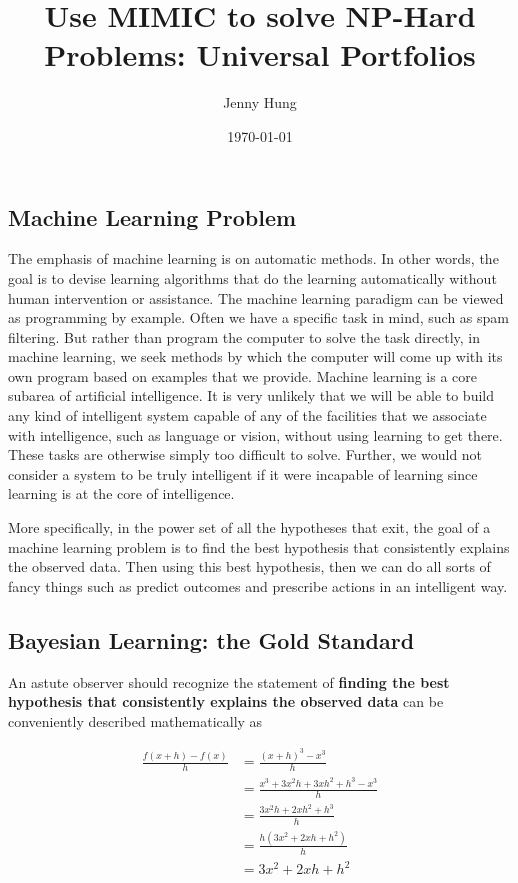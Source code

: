 \documentclass{article}
\begin{document}
\title{Use MIMIC to solve NP-Hard Problems: Universal Portfolios}
\author{Jenny Hung}
\date{\today}
\maketitle

\subsection*{Machine Learning Problem}
The emphasis of machine learning is on automatic methods. In other words, the goal is to devise learning algorithms that do the learning automatically without human intervention or assistance. The machine learning paradigm can be viewed as programming by example. Often we have a specific task in mind, such as spam filtering. But rather than program the computer to solve the task directly, in machine learning, we seek methods by which the computer will come up with its own program based on examples that we provide. Machine learning is a core subarea of artificial intelligence. It is very unlikely that we will be able to build any kind of intelligent system capable of any of the facilities that we associate with intelligence, such as language or vision, without using learning to get there. These tasks are otherwise simply too difficult to solve. Further, we would not consider a system to be truly intelligent if it were incapable of learning since learning is at the core of
intelligence. 

More specifically, in the power set of all the hypotheses that exit, the goal of a machine learning problem is to find the best hypothesis that consistently explains the observed data. Then using this best hypothesis, then we can do all sorts of fancy things such as predict outcomes and prescribe actions in an intelligent way.

\subsection*{Bayesian Learning: the Gold Standard}
An astute observer should recognize the statement of \textbf{finding the best hypothesis that consistently explains the observed data} can be conveniently described mathematically as 

\begin{align*}
    \frac{f(x+h)-f(x)}{h} & =  \frac{(x+h)^3-x^3}{h}   \\
                          & =  \frac{x^3+3x^2h+3xh^2+h^3 - x^3}{h}\\
                          & =  \frac{3x^2h+2xh^2+h^3}{h}\\
                          & =  \frac{h(3x^2+2xh+h^2)}{h}\\
                          & =  3x^2+2xh+h^2
\end{align*} 
\end{document}
